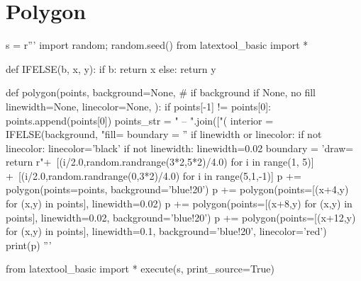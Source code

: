 \section{Polygon}

\begin{python}
s = r'''
import random; random.seed()
from latextool_basic import *

def IFELSE(b, x, y):
    if b: return x
    else: return y
    
def polygon(points,
            background=None, # if background if None, no fill
            linewidth=None,
            linecolor=None,
            ):
    if points[-1] != points[0]: points.append(points[0])
    points_str = " -- ".join(["(%
    interior = IFELSE(background, "fill=%
    boundary = ''
    if linewidth or linecolor:
        if not linecolor: linecolor='black'
        if not linewidth: linewidth=0.02
        boundary = 'draw=%
    return r" +\
         [(i/2.0,random.randrange(3*2,5*2)/4.0) for i in range(1, 5)] +\
         [(i/2.0,random.randrange(0,3*2)/4.0) for i in range(5,1,-1)]      
p += polygon(points=points, background='blue!20')
p += polygon(points=[(x+4,y) for (x,y) in points], linewidth=0.02)
p += polygon(points=[(x+8,y) for (x,y) in points], linewidth=0.02,
             background='blue!20')
p += polygon(points=[(x+12,y) for (x,y) in points], linewidth=0.1,
             background='blue!20', linecolor='red')
print(p)
'''

from latextool_basic import *
execute(s, print_source=True)
\end{python}
